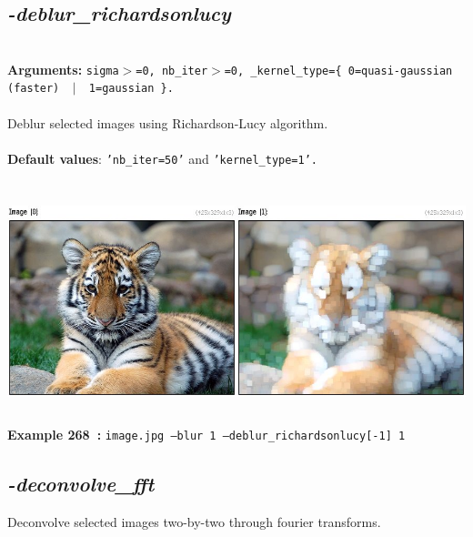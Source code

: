 \documentclass[a4paper,11pt,twoside]{book}
\begin{document}
\subsection{\emph{-deblur\_richardsonlucy} }\vspace*{-0.5em}
~\\\textbf{Arguments: } 
{\small \texttt{sigma$>$=0, nb\_iter$>$=0, \_kernel\_type=\{ 0=quasi-gaussian (faster) ~$|$~ 1=gaussian \}.}}\\~\\
Deblur selected images using Richardson-Lucy algorithm.
~\\~\\\textbf{Default values}: {\small \texttt{'nb\_iter=50'} and \texttt{'kernel\_type=1'.}}
\begin{center}\includegraphics[keepaspectratio=true,height=7cm,width=\textwidth]{img/gmic_def268.jpg}\\
{\footnotesize \textbf{Example 268~:} \texttt{image.jpg --blur 1 --deblur\_richardsonlucy[-1] 1}}
\end{center}

\subsection{\emph{-deconvolve\_fft} }\vspace*{-0.5em}
Deconvolve selected images two-by-two through fourier transforms.
\end{document}
